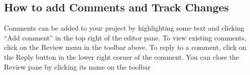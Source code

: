\documentclass{article}
\begin{document}
\subsection{How to add Comments and Track Changes}

Comments can be added to your project by highlighting some text and clicking ``Add comment'' in the top right of the editor pane. To view existing comments, click on the Review menu in the toolbar above. To reply to a comment, click on the Reply button in the lower right corner of the comment. You can close the Review pane by clicking its name on the toolbar 
\end{document}
